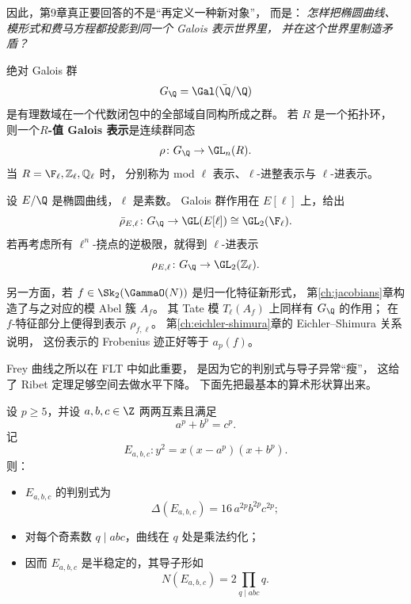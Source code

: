 

因此，第9章真正要回答的不是“再定义一种新对象”，
而是：
\emph{怎样把椭圆曲线、模形式和费马方程都投影到同一个 Galois 表示世界里，
并在这个世界里制造矛盾？}

\begin{definition}
绝对 Galois 群
\[
  G_\Q=\Gal(\bar\Q/\Q)
\]
是有理数域在一个代数闭包中的全部域自同构所成之群。
若 $R$ 是一个拓扑环，
则一个\textbf{$R$-值 Galois 表示}是连续群同态
\[
  \rho\colon G_\Q\to \GL_n(R).
\]
当 $R=\F_\ell,\Zl,\Ql$ 时，
分别称为 mod $\ell$ 表示、$\ell$-进整表示与 $\ell$-进表示。
\end{definition}

\begin{example}[椭圆曲线与模形式给出的表示]
设 $E/\Q$ 是椭圆曲线，$\ell$ 是素数。
Galois 群作用在 $E[\ell]$ 上，给出
\[
  \rhobar_{E,\ell}\colon G_\Q\to \GL(E[\ell])\cong \GL_2(\F_\ell).
\]
若再考虑所有 $\ell^n$-挠点的逆极限，就得到 $\ell$-进表示
\[
  \rho_{E,\ell}\colon G_\Q\to \GL_2(\Zl).
\]

另一方面，若 $f\in \Sk_2(\GammaO(N))$ 是归一化特征新形式，
第\ref{ch:jacobians}章构造了与之对应的模 Abel 簇 $A_f$。
其 Tate 模 $T_\ell(A_f)$ 上同样有 $G_\Q$ 的作用；
在 $f$-特征部分上便得到表示 $\rho_{f,\ell}$。
第\ref{ch:eichler-shimura}章的 Eichler--Shimura 关系说明，
这份表示的 Frobenius 迹正好等于 $a_p(f)$。
\end{example}

Frey 曲线之所以在 FLT 中如此重要，
是因为它的判别式与导子异常“瘦”，
这给了 Ribet 定理足够空间去做水平下降。
下面先把最基本的算术形状算出来。

\begin{proposition}
\label{prop:ch09-frey-discriminant}
设 $p\ge 5$，并设 $a,b,c\in \Z$ 两两互素且满足
\[
  a^p+b^p=c^p.
\]
记
\[
  E_{a,b,c}\colon y^2=x(x-a^p)(x+b^p).
\]
则：
\begin{itemize}
  \item[(i)] $E_{a,b,c}$ 的判别式为
  \[
    \Delta(E_{a,b,c})=16\,a^{2p}b^{2p}c^{2p};
  \]
  \item[(ii)] 对每个奇素数 $q\mid abc$，曲线在 $q$ 处是乘法约化；
  \item[(iii)] 因而 $E_{a,b,c}$ 是半稳定的，其导子形如
  \[
    N(E_{a,b,c})=2\prod_{q\mid abc}q.
  \]
\end{itemize}
\end{proposition}


